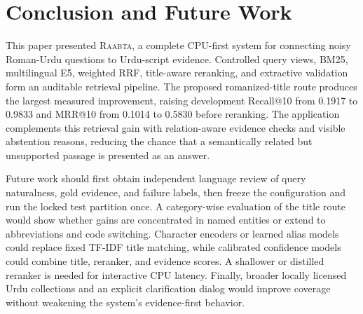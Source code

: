\documentclass[conference]{IEEEtran}
\newcommand{\system}{\textsc{Raabta}}
\begin{document}
\section{Conclusion and Future Work}
This paper presented \system, a complete CPU-first system for connecting noisy Roman-Urdu questions to Urdu-script evidence. Controlled query views, BM25, multilingual E5, weighted RRF, title-aware reranking, and extractive validation form an auditable retrieval pipeline. The proposed romanized-title route produces the largest measured improvement, raising development Recall@10 from 0.1917 to 0.9833 and MRR@10 from 0.1014 to 0.5830 before reranking. The application complements this retrieval gain with relation-aware evidence checks and visible abstention reasons, reducing the chance that a semantically related but unsupported passage is presented as an answer.

Future work should first obtain independent language review of query naturalness, gold evidence, and failure labels, then freeze the configuration and run the locked test partition once. A category-wise evaluation of the title route would show whether gains are concentrated in named entities or extend to abbreviations and code switching. Character encoders or learned alias models could replace fixed TF-IDF title matching, while calibrated confidence models could combine title, reranker, and evidence scores. A shallower or distilled reranker is needed for interactive CPU latency. Finally, broader locally licensed Urdu collections and an explicit clarification dialog would improve coverage without weakening the system's evidence-first behavior.

\balance


\end{document}
